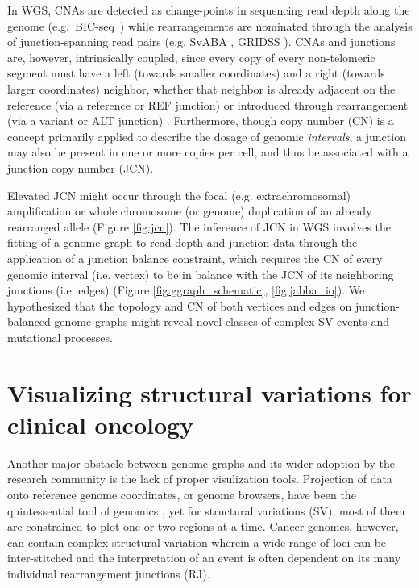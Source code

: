 \documentclass[phd,tocprelim]{cornell}
\begin{document}
In WGS, CNAs are detected as change-points \cite{chiang2009} in sequencing read depth along the genome \mbox{(e.g. BIC-seq \cite{Xi2011-oa})} while rearrangements are nominated through the analysis of junction-spanning read pairs (e.g. SvABA \cite{wala2018}, GRIDSS \cite{Cameron2017-pz}). CNAs and junctions are, however, intrinsically coupled, since every copy of every non-telomeric segment must have a left (towards smaller coordinates) and a right (towards larger coordinates) neighbor, whether that neighbor is already adjacent on the reference (via a reference or REF junction) or introduced through rearrangement (via a variant or ALT junction) \cite{Medvedev:2010bm, Greenman:2012eg}. Furthermore, though copy number (CN) is a concept primarily applied to describe the dosage of genomic \textit{intervals}, a junction may also be present in one or more copies per cell, and thus be associated with a junction copy number (JCN). 

Elevated JCN might occur through the focal (e.g. extrachromosomal) amplification \cite{Verhaak2019,Wu2019-ap} or whole chromosome (or genome) duplication of an already rearranged allele (Figure \ref{fig:jcn}). The inference of JCN in WGS involves the fitting of a genome graph to read depth and junction data through the application of a junction balance constraint, which requires the CN of every genomic interval (i.e. vertex) to be in balance with the JCN of its neighboring junctions (i.e. edges) (Figure \ref{fig:ggraph_schematic}, \ref{fig:jabba_io})\cite{Medvedev:2010bm, Greenman:2012eg, Oesper2012-vw, Li2016-qa, Dzamba2017-wo, McPherson2017-ry}. We hypothesized that the topology and CN of both vertices and edges on junction-balanced genome graphs might reveal novel classes of complex SV events and mutational processes.


\section{Visualizing structural variations for clinical oncology}
Another major obstacle between genome graphs and its wider adoption by the research community is the lack of proper visulization tools. Projection of data onto reference genome coordinates, or genome browsers, have been the quintessential tool of genomics \cite{}, yet for structural variations (SV), most of them are constrained to plot one or two regions at a time. Cancer genomes, however, can contain complex structural variation wherein a wide range of loci can be inter-stitched and the interpretation of an event is often dependent on its many individual rearrangement junctions (RJ).
\end{document}
